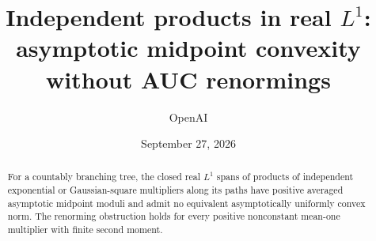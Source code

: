 \documentclass[11pt]{article}
\title{Independent products in real $L^1$:\\asymptotic midpoint convexity without AUC renormings}
\author{OpenAI}
\date{September 27, 2026}
\theoremstyle{remark}
\begin{document}
\maketitle
\begin{abstract}
For a countably branching tree, the closed real $L^1$ spans of products of
independent exponential or Gaussian-square multipliers along its paths
have positive averaged asymptotic midpoint moduli and admit no equivalent
asymptotically uniformly convex norm. The renorming obstruction holds
for every positive nonconstant mean-one multiplier with finite second moment.
\end{abstract}







\end{document}
